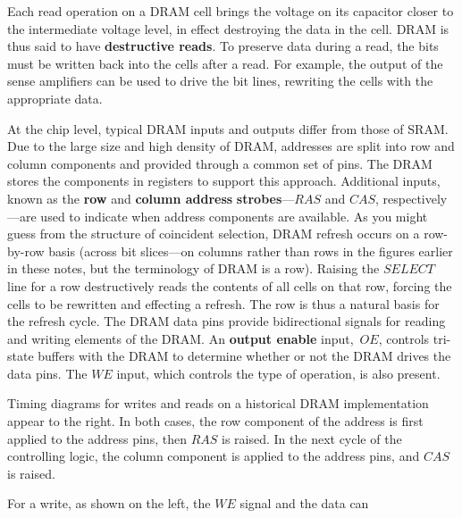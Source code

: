 Each read operation on a DRAM cell brings the voltage on its capacitor
closer to the intermediate voltage level, in effect destroying the
data in the cell.  DRAM is thus said to have {\bf destructive reads}.
To preserve data during a read, the bits must be written back
into the cells after a read.  For example, the output of the sense 
amplifiers can
be used to drive the bit lines, rewriting the cells with the
appropriate data.

At the chip level, typical DRAM inputs and outputs differ from those
of SRAM.  
%
Due to the large size and high density of DRAM,
addresses are split into row and column components and provided
through a common set of pins.  The DRAM stores the components in
registers to support this approach.  Additional inputs, known as the
{\bf row} and {\bf column address} \mbox{{\bf strobes}---$RAS$} and
$CAS$, \mbox{respectively---are} used to indicate when address
components are available.  As
you might guess from the structure of coincident selection, DRAM
refresh occurs on a row-by-row basis (across bit slices---on columns
rather than rows in the figures earlier in these notes, but the terminology
of DRAM is a row).  Raising the $SELECT$ line for a
row destructively reads the contents of all cells on that row, forcing
the cells to be rewritten and effecting a refresh.  The row is thus a
natural basis for the refresh cycle.  The DRAM data pins provide
bidirectional signals for reading and writing elements of the DRAM.
An {\bf output enable} input,~$OE$, controls tri-state buffers with
the DRAM to determine whether or not the DRAM drives the data pins.
The $WE$ input, which controls the type of operation, is
also present.

\begin{minipage}{2.25in}
Timing diagrams for writes and reads on a historical DRAM implementation
appear to the right.  In both cases, the row component of the address is 
first applied to the address pins, then $RAS$ is raised.  In the
next cycle of the controlling logic, the column component is applied
to the address pins, and $CAS$ is raised.  \mpline

For a write, as shown on the left, the $WE$ signal and the
data can\linebreak
\end{minipage}\hspace{0.25in}%
\begin{minipage}{4in}
\\
\end{minipage}\mpdone

